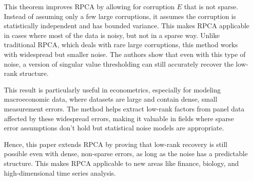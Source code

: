 \documentclass{article}
\begin{document}
\noindent This theorem improves RPCA by allowing for corruption \( E \) that is not sparse. Instead of assuming only a few large corruptions, it assumes the corruption is statistically independent and has bounded variance. This makes RPCA applicable in cases where most of the data is noisy, but not in a sparse way. Unlike traditional RPCA, which deals with rare large corruptions, this method works with widespread but smaller noise. The authors show that even with this type of noise, a version of singular value thresholding can still accurately recover the low-rank structure. 

\noindent This result is particularly useful in econometrics, especially for modeling macroeconomic data, where datasets are large and contain dense, small measurement errors. The method helps extract low-rank factors from panel data affected by these widespread errors, making it valuable in fields where sparse error assumptions don't hold but statistical noise models are appropriate.

\noindent Hence, this paper extends RPCA by proving that low-rank recovery is still possible even with dense, non-sparse errors, as long as the noise has a predictable structure. This makes RPCA applicable to new areas like finance, biology, and high-dimensional time series analysis.
\end{document}
